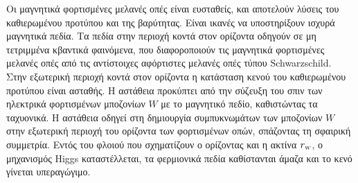 \noindent Οι μαγνητικά φορτισμένες μελανές οπές είναι ευσταθείς, και αποτελούν λύσεις του καθιερωμένου προτύπου και της βαρύτητας. Είναι ικανές να υποστηρίξουν ισχυρά μαγνητικά πεδία. Τα πεδία στην περιοχή κοντά στον ορίζοντα οδηγούν σε μη τετριμμένα κβαντικά φαινόμενα, που διαφοροποιούν τις μαγνητικά φορτισμένες μελανές οπές από τις αντίστοιχες αφόρτιστες μελανές οπές τύπου Schwarzschild.\\

Στην εξωτερική περιοχή κοντά στον ορίζοντα 
η κατάσταση κενού του καθιερωμένου προτύπου είναι ασταθής. Η αστάθεια προκύπτει από την σύζευξη του σπιν των ηλεκτρικά φορτισμένων μποζονίων $W$ με το μαγνητικό πεδίο, 
καθιστώντας τα ταχυονικά. Η αστάθεια οδηγεί 
στη δημιουργία συμπυκνωμάτων των μποζονίων  
$W$ στην εξωτερική περιοχή του ορίζοντα των φορτισμένων οπών, σπάζοντας τη σφαιρική συμμετρία. 
Εντός του φλοιού που σχηματίζουν ο ορίζοντας και η ακτίνα $r\subscr{\scriptstyle W}$, ο μηχανισμός Higgs καταστέλλεται, τα φερμιονικά πεδία καθίστανται άμαζα και το κενό γίνεται υπεραγώγιμο.\\

